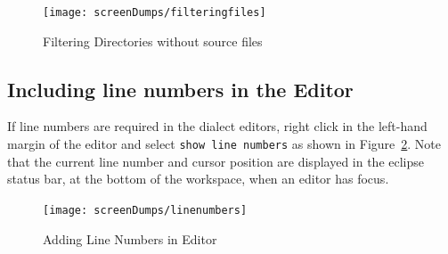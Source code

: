 \documentclass{overturerepchap}
\begin{document}
\begin{figure}[!htb]
\begin{center}
\texttt{[image: screenDumps/filteringfiles]}
\caption{Filtering Directories without source files\label{fig:filteringfiles}}
\end{center}
\end{figure}

\subsection{Including line numbers in the Editor}

If line numbers are required in the dialect
editors, right click in the left-hand margin
of the editor and select \texttt{show line numbers} as shown in
Figure~\ref{fig:linenumbers}. Note that the current
line number and cursor position are displayed in the eclipse status
bar, at the bottom of the workspace, when an editor has focus.

\begin{figure}[!htb]
\begin{center}
\texttt{[image: screenDumps/linenumbers]}
\caption{Adding Line Numbers in Editor\label{fig:linenumbers}}
\end{center}
\end{figure}



\end{document}
